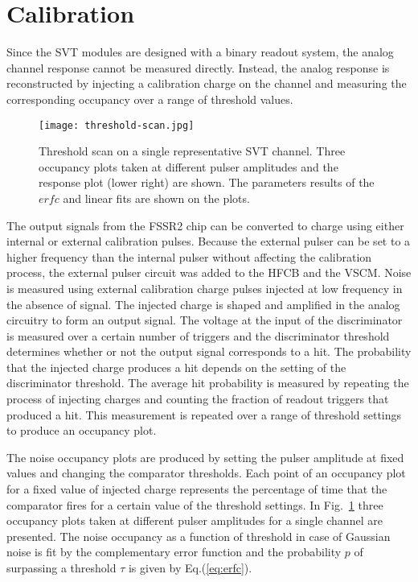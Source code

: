 \section{Calibration}

Since the SVT modules are designed with a binary readout system, the analog channel response cannot be measured
directly. Instead, the analog response is reconstructed by injecting a calibration charge on the channel and measuring
the corresponding occupancy over a range of threshold values. 

\begin{figure}[hbt] 
	\centering 
	\texttt{[image: threshold-scan.jpg]}
	\caption{Threshold scan on a single representative SVT channel. Three occupancy plots taken at different
          pulser amplitudes and the response plot (lower right) are shown. The parameters results of the $erfc$ and
          linear fits are shown on the plots.}
	\label{fig:threshold-scan}
\end{figure}

The output signals from the FSSR2 chip can be converted to charge using either internal or external calibration
pulses. Because the external pulser can be set to a higher frequency than the internal pulser without affecting the
calibration process, the external pulser circuit was added to the HFCB and the VSCM. Noise is measured using
external calibration charge pulses injected at low frequency in the absence of signal. The injected charge is shaped
and amplified in the analog circuitry to form an output signal. The voltage at the input of the discriminator is
measured over a certain number of triggers and the discriminator threshold determines whether or not the output
signal corresponds to a hit. The probability that the injected charge produces a hit depends on the setting of the
discriminator threshold. The average hit probability is measured by repeating the process of injecting charges and
counting the fraction of readout triggers that produced a hit. This measurement is repeated over a range of
threshold settings to produce an occupancy plot. 

The noise occupancy plots are produced by setting the pulser amplitude at fixed values and changing the comparator
thresholds. Each point of an occupancy plot for a fixed value of injected charge represents the percentage of time
that the comparator fires for a certain value of the threshold settings. In Fig.~\ref{fig:threshold-scan} three
occupancy plots taken at different pulser amplitudes for a single channel are presented. The noise occupancy as a
function of threshold in case of Gaussian noise is fit by the complementary error function and the probability $p$
of surpassing a threshold $\tau$ is given by Eq.(\ref{eq:erfc}). 

